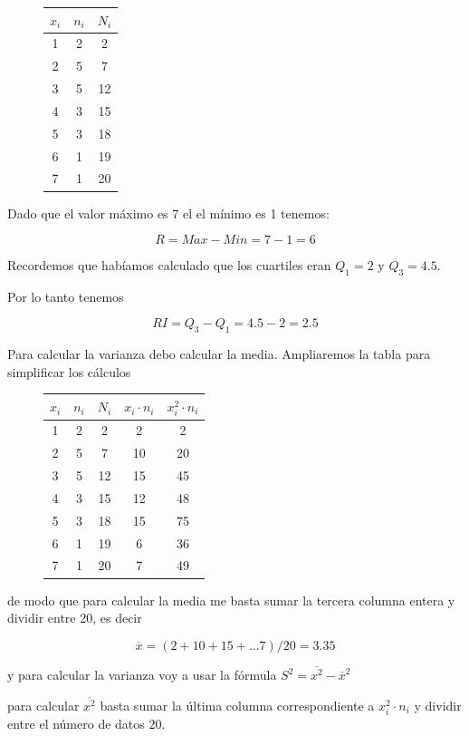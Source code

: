 \documentclass[]{article}
\theoremstyle{plain}
\theoremstyle{definition}
\theoremstyle{definition} %
\begin{document}
\begin{figure}
  \centering
\begin{tabular}{ccc}
\(x_i\) & \(n_i\) & \(N_i\)\\
\hline
1 & 2 & 2 \\
2 & 5 & 7 \\
3 & 5 & 12\\
4 & 3 & 15\\
5 & 3 & 18\\
6 & 1 & 19\\
7 & 1 & 20\\
\end{tabular}
\end{figure}

Dado que el valor máximo es 7 el el mínimo es 1 tenemos:

\[R=Max - Min = 7-1=6\]

Recordemos que habíamos calculado que los cuartiles eran \(Q_1 =2\) y
\(Q_3 = 4.5\).

Por lo tanto tenemos

\[RI= Q_3 - Q_1 = 4.5 -2 = 2.5\]

Para calcular la varianza debo calcular la media. Ampliaremos la tabla
para simplificar los cálculos

\begin{figure}
  \centering
\begin{tabular}{ccccc}
\(x_i\) & \(n_i\) & \(N_i\) & \(x_i \cdot n_i\) & \(x_i^2 \cdot n_i\)\\
\hline
1 & 2 & 2 & 2 & 2   \\
2 & 5 & 7 & 10 & 20 \\
3 & 5 & 12 & 15 & 45\\
4 & 3 & 15 & 12 & 48\\
5 & 3 & 18 & 15 & 75\\
6 & 1 & 19 & 6 & 36 \\
7 & 1 & 20 & 7 & 49 \\
\end{tabular}
\end{figure}

de modo que para calcular la media me basta sumar la tercera columna
entera y dividir entre 20, es decir

\[\overline x = (2+10+15+\ldots 7)/20 = 3.35\]

y para calcular la varianza voy a usar la fórmula
\(S^2 = \overline{x^2} - \overline x^2\)

para calcular \(\overline{x^2}\) basta sumar la última columna
correspondiente a \(x_i^2 \cdot n_i\) y dividir entre el número de datos
\(20\).
\end{document}
